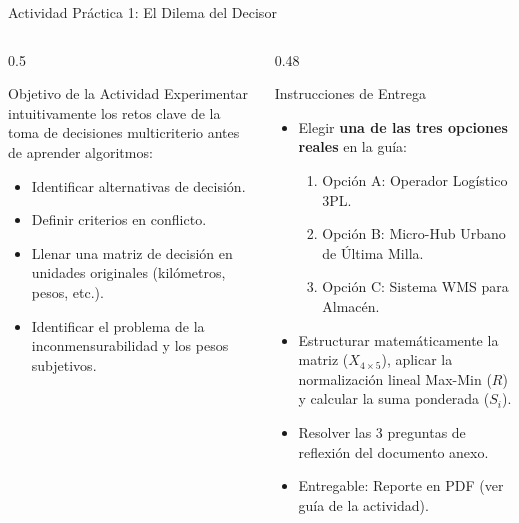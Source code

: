 \documentclass[aspectratio=169, 10pt]{beamer}
\begin{document}
\begin{frame}{Actividad Práctica 1: El Dilema del Decisor}
    \begin{columns}
        \begin{column}{0.5\textwidth}
            \begin{block}{Objetivo de la Actividad}
                \small
                Experimentar intuitivamente los retos clave de la toma de decisiones multicriterio antes de aprender algoritmos:
                \begin{itemize}
                    \item Identificar alternativas de decisión.
                    \item Definir criterios en conflicto.
                    \item Llenar una matriz de decisión en unidades originales (kilómetros, pesos, etc.).
                    \item Identificar el problema de la inconmensurabilidad y los pesos subjetivos.
                \end{itemize}
            \end{block}
        \end{column}
        
        \begin{column}{0.48\textwidth}
            \begin{exampleblock}{Instrucciones de Entrega}
                \small
                \begin{itemize}
                    \item Elegir \textbf{una de las tres opciones reales} en la guía:
                        \begin{enumerate}
                            \scriptsize
                            \item Opción A: Operador Logístico 3PL.
                            \item Opción B: Micro-Hub Urbano de Última Milla.
                            \item Opción C: Sistema WMS para Almacén.
                        \end{enumerate}
                    \item Estructurar matemáticamente la matriz ($X_{4 \times 5}$), aplicar la normalización lineal Max-Min ($R$) y calcular la suma ponderada ($S_i$).
                    \item Resolver las 3 preguntas de reflexión del documento anexo.
                    \item Entregable: Reporte en PDF (ver guía de la actividad).
                \end{itemize}
            \end{exampleblock}
        \end{column}
    \end{columns}
\end{frame}
\end{document}
